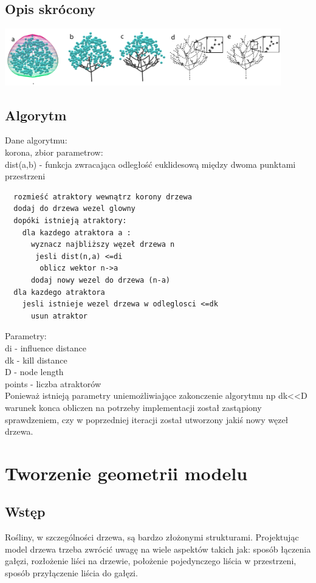 \subsection{Opis skrócony}
\begin{center}
	\includegraphics[width=120mm]{images/colonization/colonization.png}
	\label{colonization_colonization}
\end{center}


\subsection{Algorytm}
Dane algorytmu: \\
korona, zbior parametrow: \\
dist(a,b) - funkcja zwracająca odległość euklidesową między dwoma punktami przestrzeni  \\
\begin{verbatim}
  rozmieść atraktory wewnątrz korony drzewa
  dodaj do drzewa wezel glowny
  dopóki istnieją atraktory:
    dla kazdego atraktora a :
      wyznacz najbliższy węzeł drzewa n
       jesli dist(n,a) <=di
        oblicz wektor n->a
      dodaj nowy wezel do drzewa (n-a)
  dla kazdego atraktora
    jesli istnieje wezel drzewa w odleglosci <=dk
      usun atraktor
\end{verbatim}
Parametry: \\
di - influence distance\\
dk - kill distance\\
D - node length\\
points - liczba atraktorów\\

Ponieważ istnieją parametry uniemożliwiające zakonczenie algorytmu np dk<<D warunek konca obliczen na potrzeby implementacji został zastąpiony sprawdzeniem, czy w poprzedniej iteracji został utworzony jakiś nowy węzeł drzewa.
\section{Tworzenie geometrii modelu}
\subsection{Wstęp}
Rośliny, w szczególności drzewa, są bardzo złożonymi strukturami. Projektując model drzewa trzeba zwrócić uwagę na wiele aspektów takich jak: sposób łączenia gałęzi, rozłożenie liści na drzewie, położenie pojedynczego liścia w przestrzeni, sposób przyłączenie liścia do gałęzi.


